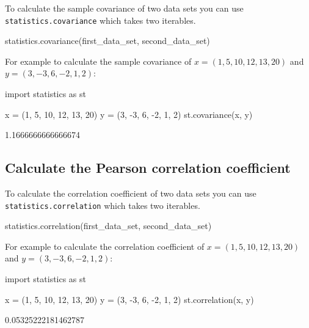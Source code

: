 To calculate the sample covariance of two data sets you can use
\texttt{statistics.covariance} which takes two iterables.


\begin{pyin}
statistics.covariance(first_data_set, second_data_set)
\end{pyin}



For example to calculate the sample covariance of \(x=(1, 5, 10, 12, 13, 20)\)
and \(y=(3, -3, 6, -2, 1, 2)\):




\begin{pyin}
import statistics as st

x = (1, 5, 10, 12, 13, 20)
y = (3, -3, 6, -2, 1, 2)
st.covariance(x, y)
\end{pyin}





\begin{raw}
1.1666666666666674
\end{raw}





\subsection{Calculate the Pearson correlation coefficient}
\label{\detokenize{tools-for-mathematics/08-statistics/how/main:calculate-the-pearson-correlation-coefficient}}

To calculate the correlation coefficient of two data sets you can use
\texttt{statistics.correlation} which takes two iterables.


\begin{pyin}
statistics.correlation(first_data_set, second_data_set)
\end{pyin}



For example to calculate the correlation coefficient of \(x=(1, 5, 10, 12, 13, 20)\)
and \(y=(3, -3, 6, -2, 1, 2)\):




\begin{pyin}
import statistics as st

x = (1, 5, 10, 12, 13, 20)
y = (3, -3, 6, -2, 1, 2)
st.correlation(x, y)
\end{pyin}





\begin{raw}
0.05325222181462787
\end{raw}





